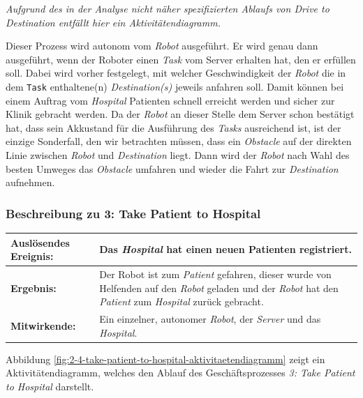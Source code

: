 			\emph{Aufgrund des in der Analyse nicht näher spezifizierten Ablaufs von \emph{Drive to Destination} 
			entfällt hier ein Aktivitätendiagramm.}

			Dieser Prozess wird autonom vom \emph{Robot} ausgeführt. 
			Er wird genau dann ausgeführt, wenn der Roboter einen \emph{Task} vom Server erhalten hat, den er erfüllen soll. 
			Dabei wird vorher festgelegt, mit welcher Geschwindigkeit der \emph{Robot} die in dem \texttt{Task} enthaltene(n) \emph{Destination(s)} jeweils anfahren soll. 
			Damit können bei einem Auftrag vom \emph{Hospital} Patienten schnell erreicht werden und sicher zur Klinik gebracht werden. 
			Da der \emph{Robot} an dieser Stelle dem Server schon bestätigt hat, dass sein Akkustand für die Ausführung des \emph{Tasks} ausreichend ist, 
			ist der einzige Sonderfall, den wir betrachten müssen, dass ein \emph{Obstacle} auf der direkten Linie zwischen \emph{Robot} und \emph{Destination} liegt. 
			Dann wird der \emph{Robot} nach Wahl des besten Umweges das \emph{Obstacle} umfahren und wieder die Fahrt zur \emph{Destination} aufnehmen.

			\subsubsection*{Beschreibung zu 3: Take Patient to Hospital}

			\begin{table}[H]
				\centering
				\begin{tabularx}{\textwidth}{|p{3cm}|X|}
				\hline
				\textbf{Auslösendes Ereignis:} & Das \emph{Hospital} hat einen neuen Patienten registriert.\\ \hline
				\textbf{Ergebnis:} & Der Robot ist zum \emph{Patient} gefahren, dieser wurde von Helfenden auf den \emph{Robot} geladen 
				und der \emph{Robot} hat den \emph{Patient} zum \emph{Hospital} zurück gebracht.\\ \hline
				\textbf{Mitwirkende:} &	Ein einzelner, autonomer \emph{Robot}, der \emph{Server} und das \emph{Hospital}. \\
				\hline
				\end{tabularx}
				\label{tab:2-4-take-patient-to-hospital}
			\end{table}

			Abbildung \ref{fig:2-4-take-patient-to-hospital-aktivitaetendiagramm} zeigt ein Aktivitätendiagramm, welches den Ablauf des Geschäftsprozesses \emph{3: Take Patient to Hospital} darstellt.

